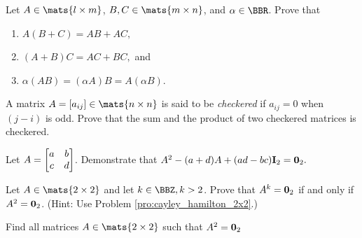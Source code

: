 \begin{pro}
Let 
$A\in \mats{l\times m}$,
$B, C\in \mats{m\times n}$, and $ \alpha\in \BBR$. Prove
that
\begin{enumerate}
\item
$A(B+C) = AB + AC,$ 
\item
$(A+B)C = AC + BC,$ and 
\item
$\alpha (AB) = (\alpha A)B
= A(\alpha B).$
\end{enumerate}
\end{pro}


\begin{pro}
A matrix $A = [a_{ij}]\in \mats{n\times n}$ is said to be {\em
checkered}  if $a_{ij} = 0$ when $(j - i)$ is odd. Prove that the
sum and the product of two checkered matrices is checkered.
\end{pro}




\begin{pro} \label{pro:cayley_hamilton_2x2}
Let $A = \begin{bmatrix}a & b \cr c & d \cr \end{bmatrix}$.
Demonstrate that $A^2 - (a + d)A + (ad - bc){\bf I}_2= {\bf 0}_2.$
\end{pro}

\begin{pro}
Let $A\in\mats{2\times 2}$ and let $k\in\BBZ, k >2$. Prove that $A^k
= {\bf 0}_2 $ if and only if $A^2 = {\bf 0}_2$.
(Hint: Use Problem \ref{pro:cayley_hamilton_2x2}.)
\end{pro}
\begin{pro}Find all matrices $A\in\mats{2\times 2}$ such that $A^2 = {\bf 0}_2$
\end{pro}

